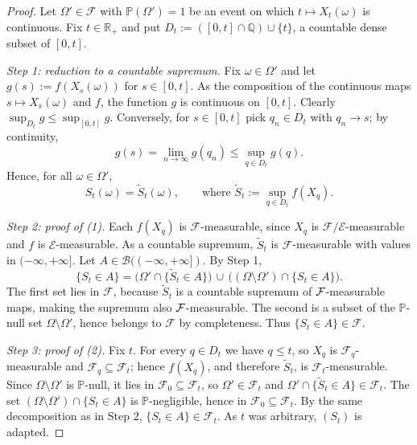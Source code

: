 \begin{proof}
Let $\Omega'\in\mathcal F$ with $\mathbb P(\Omega')=1$ be an event on which
$t\mapsto X_t(\omega)$ is continuous. Fix $t\in\mathbb R_+$ and put
$D_t := ([0,t]\cap\mathbb Q)\cup\{t\}$, a countable dense subset of $[0,t]$.

\emph{Step 1: reduction to a countable supremum.}
Fix $\omega\in\Omega'$ and let $g(s):=f(X_s(\omega))$ for $s\in[0,t]$. As the
composition of the continuous maps $s\mapsto X_s(\omega)$ and $f$, the function
$g$ is continuous on $[0,t]$. Clearly $\sup_{D_t} g\le\sup_{[0,t]} g$.
Conversely, for $s\in[0,t]$ pick $q_n\in D_t$ with $q_n\to s$; by continuity,
\[
  g(s)=\lim_{n\to\infty} g(q_n)\le\sup_{q\in D_t} g(q).
\]
Hence, for all $\omega\in\Omega'$,
\[
  S_t(\omega)=\widetilde S_t(\omega),
  \qquad\text{where } \widetilde S_t:=\sup_{q\in D_t} f(X_q).
\]

\emph{Step 2: proof of (1).}
Each $f(X_q)$ is $\mathcal F$-measurable, since $X_q$ is
$\mathcal F/\mathcal E$-measurable and $f$ is $\mathcal E$-measurable. As a
countable supremum, $\widetilde S_t$ is $\mathcal F$-measurable with values in
$(-\infty,+\infty]$. Let $A\in\mathcal B((-\infty,+\infty])$. By Step 1,
\[
  \{S_t\in A\}
  =\bigl(\Omega'\cap\{\widetilde S_t\in A\}\bigr)
   \,\cup\,\bigl((\Omega\setminus\Omega')\cap\{S_t\in A\}\bigr).
\]
The first set lies in $\mathcal F$, because $\tilde{S}_t$ is a countable supremum of $\mathcal{F}$-measurable maps, making the supremum also $\mathcal{F}$-measurable. The second is a subset of the
$\mathbb P$-null set $\Omega\setminus\Omega'$, hence belongs to $\mathcal F$ by
completeness. Thus $\{S_t\in A\}\in\mathcal F$.

\emph{Step 3: proof of (2).}
Fix $t$. For every $q\in D_t$ we have $q\le t$, so $X_q$ is
$\mathcal F_q$-measurable and $\mathcal F_q\subseteq\mathcal F_t$; hence
$f(X_q)$, and therefore $\widetilde S_t$, is $\mathcal F_t$-measurable.
Since $\Omega\setminus\Omega'$ is $\mathbb P$-null, it lies in
$\mathcal F_0\subseteq\mathcal F_t$, so $\Omega'\in\mathcal F_t$ and
$\Omega'\cap\{\widetilde S_t\in A\}\in\mathcal F_t$. The set
$(\Omega\setminus\Omega')\cap\{S_t\in A\}$ is $\mathbb P$-negligible, hence in
$\mathcal F_0\subseteq\mathcal F_t$. By the same decomposition as in Step 2,
$\{S_t\in A\}\in\mathcal F_t$. As $t$ was arbitrary, $(S_t)$ is adapted.
\end{proof}

